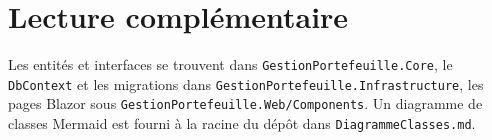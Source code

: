 \section{Lecture complémentaire}

Les entités et interfaces se trouvent dans \texttt{GestionPortefeuille.Core}, le \texttt{DbContext} et les migrations dans \texttt{GestionPortefeuille.Infrastructure}, les pages Blazor sous \texttt{GestionPortefeuille.Web/Components}. Un diagramme de classes Mermaid est fourni à la racine du dépôt dans \texttt{DiagrammeClasses.md}.
